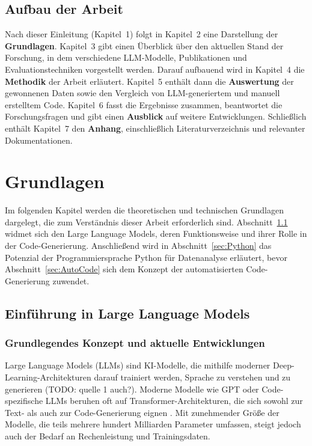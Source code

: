 \documentclass[11pt,a4paper]{article}
\begin{document}
\subsection{Aufbau der Arbeit}
Nach dieser Einleitung (Kapitel~1) folgt in Kapitel~2 eine Darstellung der \textbf{Grundlagen}. Kapitel~3 gibt einen Überblick über den aktuellen Stand der Forschung, in dem verschiedene LLM-Modelle, Publikationen und Evaluationstechniken vorgestellt werden. Darauf aufbauend wird in Kapitel~4 die \textbf{Methodik} der Arbeit erläutert. Kapitel~5 enthält dann die \textbf{Auswertung} der gewonnenen Daten sowie den Vergleich von LLM-generiertem und manuell erstelltem Code. Kapitel~6 fasst die Ergebnisse zusammen, beantwortet die Forschungsfragen und gibt einen \textbf{Ausblick} auf weitere Entwicklungen. Schließlich enthält Kapitel~7 den \textbf{Anhang}, einschließlich Literaturverzeichnis und relevanter Dokumentationen.

\section{Grundlagen}

Im folgenden Kapitel werden die theoretischen und technischen Grundlagen dargelegt, die zum Verständnis dieser Arbeit erforderlich sind. Abschnitt~\ref{sec:LLMs} widmet sich den Large Language Models, deren Funktionsweise und ihrer Rolle in der Code-Generierung. Anschließend wird in Abschnitt~\ref{sec:Python} das Potenzial der Programmiersprache Python für Datenanalyse erläutert, bevor Abschnitt~\ref{sec:AutoCode} sich dem Konzept der automatisierten Code-Generierung zuwendet.

\subsection{Einführung in Large Language Models}
\label{sec:LLMs}

\subsubsection{Grundlegendes Konzept und aktuelle Entwicklungen}
Large Language Models (LLMs) sind KI-Modelle, die mithilfe moderner Deep-Learning-Architekturen darauf trainiert werden, Sprache zu verstehen und zu generieren \cite{web:2}(TODO: quelle 1 auch?). Moderne Modelle wie GPT oder Code-spezifische LLMs beruhen oft auf Transformer-Architekturen, die sich sowohl zur Text- als auch zur Code-Generierung eignen \cite{web:5}. Mit zunehmender Größe der Modelle, die teils mehrere hundert Milliarden Parameter umfassen, steigt jedoch auch der Bedarf an Rechenleistung und Trainingsdaten.
\end{document}
